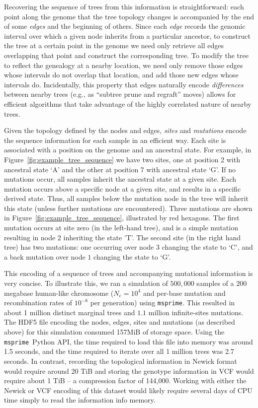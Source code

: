 \documentclass{article}
\newcommand{\msprime}{\texttt{msprime}}
\begin{document}
Recovering the sequence of trees from this information is straightforward:
each point along the genome that the tree topology changes
is accompanied by the end of some \emph{edges} and the beginning of others.
Since each \emph{edge} records the genomic interval 
over which a given node inherits from a particular ancestor,
to construct the tree at a certain point in the genome
we need only retrieve all edges overlapping that point
and construct the corresponding tree.
To modify the tree to reflect the genealogy at a nearby location,
we need only remove those edges whose intervals do not overlap that location,
and add those new edges whose intervals do.
Incidentally, this property that edges naturally encode \emph{differences}
between nearby trees (e.g., as ``subtree prune and regraft'' moves)
allows for efficient algorithms that take advantage
of the highly correlated nature of nearby trees.

Given the topology defined by the nodes and edges, \emph{sites} and \emph{mutations}
encode the sequence information for each sample in an efficient way. Each site
is associated with a position on the genome and an ancestral state. For example,
in Figure~\ref{fig:example_tree_sequence} we have two sites, one at position
2 with ancestral state `A' and the other at position 7 with ancestral state `G'. If
no mutations occur, all samples inherit the ancestral state at a given site.
Each mutation occurs above a specific node at a given site, 
and results in a specific derived state. 
Thus, all samples below the mutation node in the tree will inherit this state 
(unless further mutations are encountered). 
Three mutations are shown in Figure~\ref{fig:example_tree_sequence}, 
illustrated by red hexagons. 
The first mutation occurs at site zero (in the left-hand tree), and is a simple
mutation resulting in node $2$ inheriting the state 'T'. 
The second site (in the right hand tree) has two mutations: 
one occurring over node $3$ changing the state to `C', 
and a back mutation over node $1$ changing the state to `G'.

This encoding of a sequence of trees and accompanying mutational information is
very concise. To illustrate this, we ran a simulation of $500,000$ samples of a
$200$ megabase human-like chromosome ($N_e=10^4$ and per-base mutation and
recombination rates of $10^{-8}$ per generation) using \msprime. This resulted
in about 1 million distinct marginal trees and $1.1$ million infinite-sites
mutations. The HDF5 file encoding the nodes, edges, sites and mutations (as
described above) for this simulation consumed 157MiB of storage space. Using
the \msprime\ Python API, the time required to load this file into memory was
around 1.5 seconds, and the time required to iterate over all 1 million trees
was 2.7 seconds. In contrast, recording the topological information in Newick
format would require around 20 TiB and storing the genotype information
in VCF would require about 1 TiB --
a compression factor of 144,000.
Working with either the Newick or VCF encoding
of this dataset would likely require several
days of CPU time simply to read the information info memory.
\end{document}
